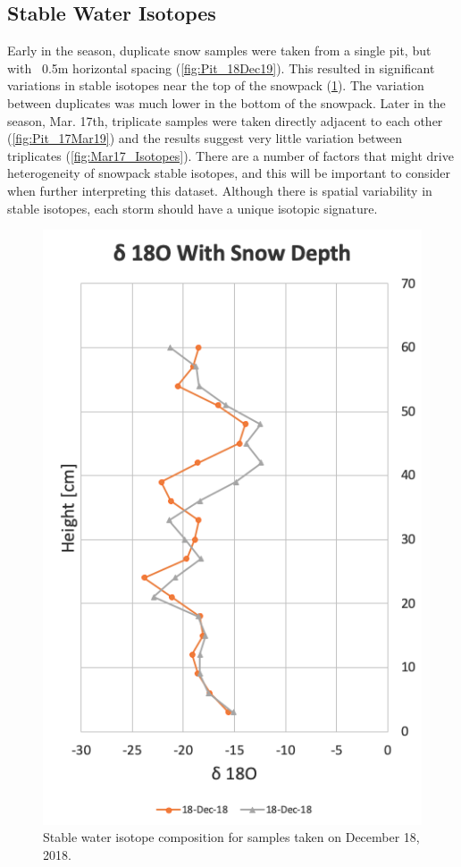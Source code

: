 \subsection{Stable Water Isotopes}
Early in the season, duplicate snow samples were taken from a single pit, but with ~0.5m horizontal spacing (\ref{fig:Pit_18Dec19}). This resulted in significant variations in stable isotopes near the top of the snowpack (\ref{fig:Dec18_Isotopes}). The variation between duplicates was much lower in the bottom of the snowpack. Later in the season, Mar. 17th, triplicate samples were taken directly adjacent to each other (\ref{fig:Pit_17Mar19}) and the results suggest very little variation between triplicates (\ref{fig:Mar17_Isotopes}). There are a number of factors that might drive heterogeneity of snowpack stable isotopes, and this will be important to consider when further interpreting this dataset. Although there is spatial variability in stable isotopes, each storm should have a unique isotopic signature. 

\begin{figure}[H]
    \centering
    \includegraphics[width=0.7\linewidth]{figures/Isotopes/Dec18_Isotopes.png}
    \caption{Stable water isotope composition for samples taken on December 18, 2018. }
    \label{fig:Dec18_Isotopes}
\end{figure}

